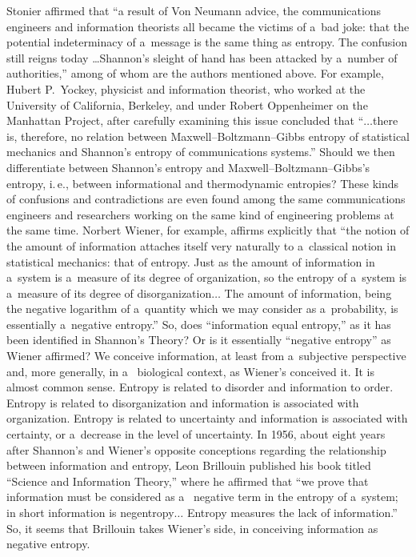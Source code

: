 \begin{multicols}{2}
Stonier affirmed that ``a result of Von Neumann advice, the communications engineers and 
information theorists all became the victims of a~bad joke: that the potential indeterminacy 
of a~message is the same thing as entropy. The confusion still reigns today \ldots Shannon's 
sleight of hand has been attacked by a~number of authorities,'' among of whom are the 
authors mentioned above. For example, Hubert P.~Yockey, physicist and information 
theorist, who worked at the University of California, Berkeley, and under Robert 
Oppenheimer on the Manhattan Project, after carefully examining this issue concluded that 
``$\ldots$there is, therefore, no relation between Maxwell--Boltzmann--Gibbs entropy of 
statistical mechanics and Shannon's entropy of communications systems.'' Should we then 
differentiate between Shannon's entropy and Maxwell--Boltzmann--Gibbs's entropy, i.\,e., 
between informational and thermodynamic entropies? These kinds of confusions and 
contradictions are even found among the same communications engineers and researchers 
working on the same kind of engineering problems at the same time. Norbert Wiener, for 
example, affirms explicitly that 
``the notion of the amount of information attaches itself 
very naturally to a~classical notion in statistical mechanics: that of entropy. Just as the 
amount of information in a~system is a~measure of its degree of organization, so the entropy 
of a~system is a~measure of its degree of disorganization$\ldots$ 
The amount of information, 
being the negative logarithm of a~quantity which we may consider as a~probability, is 
essentially a~negative entropy.'' So, does ``information equal entropy,'' as it has been 
identified in Shannon's Theory? Or is it essentially ``negative entropy'' as Wiener affirmed? 
We conceive information, at least from a~subjective perspective and, more generally, in a~
biological context, as Wiener's conceived it. It is almost common sense. Entropy is related 
to disorder and information to order. Entropy is related to disorganization and information 
is associated with organization. Entropy is related to uncertainty and information is 
associated with certainty, or a~decrease in the level of uncertainty. In 1956, about eight years 
after Shannon's and Wiener's opposite conceptions regarding the relationship between 
information and entropy, Leon Brillouin published his book titled ``Science and Information 
Theory,'' where he affirmed that ``we prove that information must be considered as a~
negative term in the entropy of a~system; in short information is negentropy$\ldots$ Entropy 
measures the lack of information.'' So, it seems that Brillouin takes Wiener's side, in 
conceiving information as negative entropy. 


\end{multicols}
